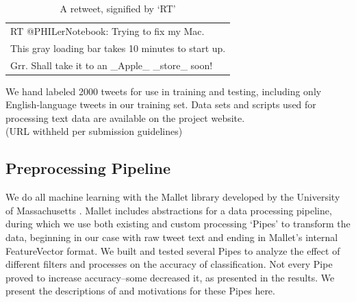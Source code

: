 \documentclass[letterpaper]{article}
\begin{document}
\begin{table}[h]
\centering
\begin{tabular}{|l|}
	\hline
	RT @PHILerNotebook: Trying to fix my Mac. \\ This gray loading bar takes 10 minutes to start up. \\ Grr. Shall take it to an \_Apple\_ \_store\_ soon! \\
	\hline
\end{tabular}
\caption{A retweet, signified by `RT'}
\end{table}

We hand labeled 2000 tweets for use in training and testing, including only English-language tweets in our training set. Data sets and scripts used for processing text data are available on the project website.\\
 (URL withheld per submission guidelines)\\

\subsection{Preprocessing Pipeline}

We do all machine learning with the Mallet library developed by the University of Massachusetts \cite{McCallumMALLET}. Mallet includes abstractions for a data processing pipeline, during which we use both existing and custom processing `Pipes' to transform the data, beginning in our case with raw tweet text and ending in Mallet's internal FeatureVector format. We built and tested several Pipes to analyze the effect of different filters and processes on the accuracy of classification. Not every Pipe proved to increase accuracy--some decreased it, as presented in the results. We present the descriptions of and motivations for these Pipes here.
\end{document}
